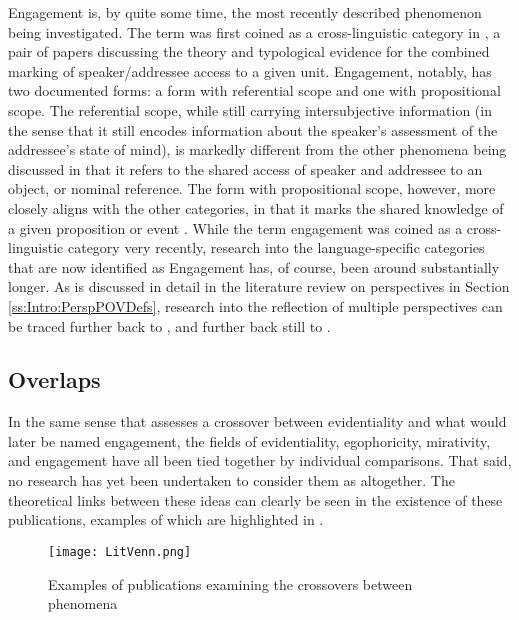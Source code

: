 Engagement is, by quite some time, the most recently described phenomenon being investigated. The term was first coined as a cross-linguistic category in , a pair of papers discussing the theory and typological evidence for the combined marking of speaker/addressee access to a given unit. Engagement, notably, has two documented forms: a form with referential scope and one with propositional scope. The referential scope, while still carrying intersubjective information (in the sense that it still encodes information about the speaker's assessment of the addressee's state of mind), is markedly different from the other phenomena being discussed in that it refers to the shared access of speaker and addressee to an object, or nominal reference. The form with propositional scope, however, more closely aligns with the other categories, in that it marks the shared knowledge of a given proposition or event \cite{EvansBergqvistSanRoque2018b}. While the term engagement was coined as a cross-linguistic category very recently, research into the language-specific categories that are now identified as Engagement has, of course, been around substantially longer. As is discussed in detail in the literature review on perspectives in Section \ref{ss:Intro:PerspPOVDefs}, research into the reflection of multiple perspectives can be traced further back to , and further back still to .

\subsection{Overlaps}\label{ss:Intro:Overlaps}
In the same sense that  assesses a crossover between evidentiality and what would later be named engagement, the fields of evidentiality, egophoricity, mirativity, and engagement have all been tied together by individual comparisons. That said, no research has yet been undertaken to consider them as altogether.  The theoretical links between these ideas can clearly be seen in the existence of these publications, examples of which are highlighted in .
\nocite{Lau2017} \nocite{Hyslop2018} \nocite{Bergqvist2020} \nocite{Widmer2020}

\begin{figure}
    \centering
    \texttt{[image: LitVenn.png]}
    \caption{Examples of publications examining the crossovers between phenomena}
    \label{fig:LitVenn}
\end{figure}


